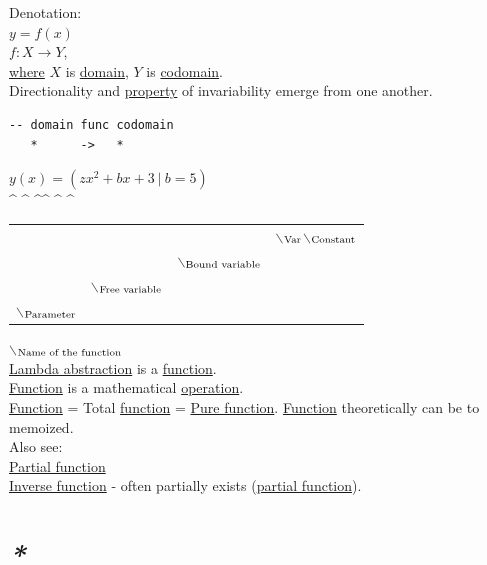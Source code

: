 \documentclass[a4paper,14pt,oneside]{book}
\begin{document}
Denotation:\\
\(y = f(x)\)\\
\(f: X \to Y\),\\
\hyperref[org1a56575]{where} \(X\) is \hyperref[orge94fc58]{domain}, \(Y\) is \hyperref[org2fb83bf]{codomain}.\\

Directionality and \hyperref[orgc713167]{property} of invariability emerge from one another.\\
\begin{verbatim}
-- domain func codomain
   *      ->   *
\end{verbatim}

\(y(x) = (zx^{2} + bx + 3 \ | \ b = 5)\)\\
\^{} \^{}    \^{}\^{}    \^{}   \^{}\\
\begin{center}
\begin{tabular}{llll}
 &  &  & $\backslash$\(\textsubscript{Var}\)$\backslash$\(\textsubscript{Constant}\)\\
 &  & $\backslash$\(\textsubscript{Bound variable}\)\\
 & $\backslash$\(\textsubscript{Free variable}\)\\
$\backslash$\(\textsubscript{Parameter}\)\\
\end{tabular}
\end{center}
$\backslash$\(\textsubscript{Name of the function}\)\\

\hyperref[orgd9f46da]{Lambda abstraction} is a \hyperref[orge00b05b]{function}.\\
\hyperref[orge00b05b]{Function} is a mathematical \hyperref[org894d189]{operation}.\\

\hyperref[orge00b05b]{Function} = Total \hyperref[orge00b05b]{function} = \hyperref[org95131ad]{Pure function}. \hyperref[orge00b05b]{Function} theoretically can be to memoized.\\

Also see:\\
\hyperref[orga1a41e5]{Partial function}\\
\hyperref[orgd6b6b98]{Inverse function} - often partially exists (\hyperref[orga1a41e5]{partial function}).\\

\section{\emph{*}}
\label{sec:orgb0493ab}
\end{document}
